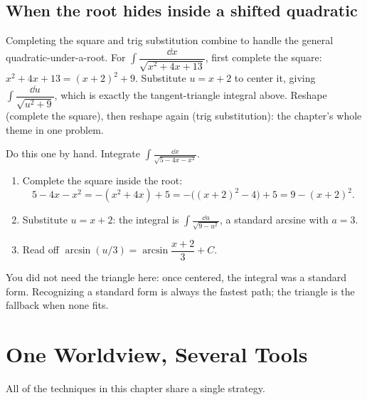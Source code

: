\subsection{When the root hides inside a shifted quadratic}

Completing the square and trig substitution combine to handle the general
quadratic-under-a-root. For $\int \dfrac{\dd x}{\sqrt{x^2 + 4x + 13}}$, first
complete the square: $x^2 + 4x + 13 = (x+2)^2 + 9$. Substitute $u = x+2$ to
center it, giving $\int \dfrac{\dd u}{\sqrt{u^2 + 9}}$, which is exactly the
tangent-triangle integral above. Reshape (complete the square), then reshape
again (trig substitution): the chapter's whole theme in one problem.

\begin{labbox}
Do this one by hand. Integrate
$\displaystyle \int \frac{\dd x}{\sqrt{5 - 4x - x^2}}.$
\begin{enumerate}
\item Complete the square inside the root:
   \[
   5 - 4x - x^2 = -(x^2 + 4x) + 5 = -\big((x+2)^2 - 4\big) + 5 = 9 - (x+2)^2.
   \]
\item Substitute $u = x+2$: the integral is $\displaystyle\int
   \frac{\dd u}{\sqrt{9 - u^2}}$, a standard arcsine with $a = 3$.
\item Read off $\arcsin(u/3) = \arcsin\!\dfrac{x+2}{3} + C$.
\end{enumerate}
You did not need the triangle here: once centered, the integral was a
standard form. Recognizing a standard form is always the fastest path; the
triangle is the fallback when none fits.
\end{labbox}

\section{One Worldview, Several Tools}
\label{ch24:synthesis}

All of the techniques in this chapter share a single strategy.

